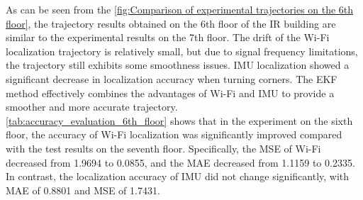 \documentclass[12pt,a4paper]{article}
\numberwithin{equation}{section}
\begin{document}
\noindent As can be seen from the \autoref{fig:Comparison of experimental trajectories on the 6th floor}, the trajectory results obtained on the 6th floor of the IR building are similar to the experimental results on the 7th floor. The drift of the Wi-Fi localization trajectory is relatively small, but due to signal frequency limitations, the trajectory still exhibits some smoothness issues. IMU localization showed a significant decrease in localization accuracy when turning corners. The EKF method effectively combines the advantages of Wi-Fi and IMU to provide a smoother and more accurate trajectory.\\
\autoref{tab:accuracy_evaluation_6th_floor} shows that in the experiment on the sixth floor, the accuracy of Wi-Fi localization was significantly improved compared with the test results on the seventh floor. Specifically, the MSE of Wi-Fi decreased from 1.9694 to 0.0855, and the MAE decreased from 1.1159 to 0.2335. In contrast, the localization accuracy of IMU did not change significantly, with MAE of 0.8801 and MSE of 1.7431.
\end{document}
